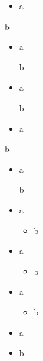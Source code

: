 \begin{itemize}
\tightlist
\item
  a
\end{itemize}

b

\begin{itemize}
\item
  a

  b
\end{itemize}

\begin{itemize}
\item
  a

  b
\end{itemize}

\begin{itemize}
\tightlist
\item
  a
\end{itemize}

b

\begin{itemize}
\item
  a

  b
\end{itemize}

\begin{itemize}
\item
  a

  \begin{itemize}
  \tightlist
  \item
    b
  \end{itemize}
\end{itemize}

\begin{itemize}
\tightlist
\item
  a

  \begin{itemize}
  \tightlist
  \item
    b
  \end{itemize}
\end{itemize}

\begin{itemize}
\tightlist
\item
  a

  \begin{itemize}
  \tightlist
  \item
    b
  \end{itemize}
\end{itemize}

\begin{itemize}
\tightlist
\item
  a
\item
  b
\end{itemize}

